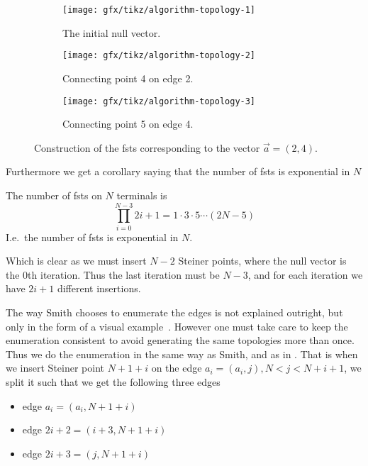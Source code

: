 \begin{figure}[htbp] \centering
  \begin{subfigure}[t]{0.3\textwidth}
    \texttt{[image: gfx/tikz/algorithm-topology-1]}
    \caption{The initial null vector.\label{fig:algorithm-topology-1}}
  \end{subfigure} \hfill
  \begin{subfigure}[t]{0.3\textwidth}
    \texttt{[image: gfx/tikz/algorithm-topology-2]}
    \caption{Connecting point 4 on edge 2.\label{fig:algorithm-topology-2}}
  \end{subfigure} \hfill
  \begin{subfigure}[t]{0.3\textwidth}
    \texttt{[image: gfx/tikz/algorithm-topology-3]}
    \caption{Connecting point 5 on edge 4.\label{fig:algorithm-topology-3}}
  \end{subfigure}
  \caption[Construction of FSTs]{Construction of the \glspl{fst} corresponding
to the vector $\vec{a} = (2, 4)$.\label{fig:algorithm-topologies}}
\end{figure}

Furthermore we get a corollary saying that the number of \glspl{fst} is
exponential in $N$

\begin{corollary}
\label{cor:number-of-fsts} The number of \glspl{fst} on $N$ terminals is
\[\prod_{i=0}^{N-3} 2i+1 = 1 \cdot 3 \cdot 5 \cdots (2N - 5)\] I.e.\ the number
of \glspl{fst} is exponential in $N$.
\end{corollary}

Which is clear as we must insert $N-2$ Steiner points, where the null vector is
the $0$th iteration.  Thus the last iteration must be $N-3$, and for each
iteration we have $2i+1$ different insertions.

The way Smith chooses to enumerate the edges is not explained outright, but only
in the form of a visual example~\cite{Smith1992}.  However one must take care to
keep the enumeration consistent to avoid generating the same topologies more
than once.  Thus we do the enumeration in the same way as Smith, and as in
.  That is when we insert Steiner point $N+1+i$
on the edge $a_{i} = (a_{i}, j), N < j < N+i+1$, we split it such that we get
the following three edges
%
\begin{itemize}
\item edge $a_{i} = (a_{i},N+1+i)$
\item edge $ 2i + 2 = (i+3,N+1+i)$
\item edge $ 2i + 3 = (j,N+1+i)$
\end{itemize}

